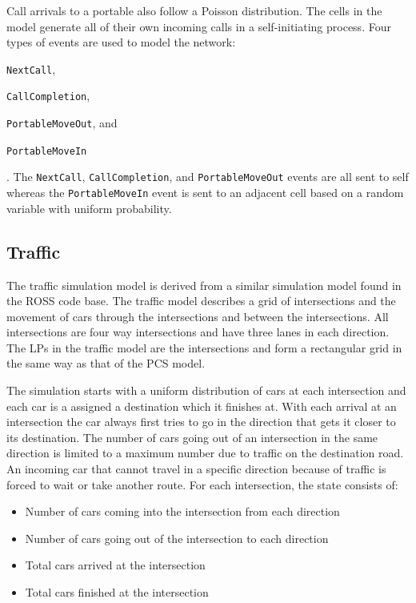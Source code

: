 \documentclass[11pt]{book}
\begin{document}
\noindent
Call arrivals to a portable also follow a Poisson distribution.  The cells in the model generate all
of their own incoming calls in a self-initiating process.  Four types of events are used to model
the network: \begin{inparaenum}[(1)] \item \texttt{NextCall},
\item \texttt{CallCompletion}, \item \texttt{PortableMoveOut}, and \item \texttt{PortableMoveIn}
\end{inparaenum}.  The \texttt{NextCall}, \texttt{CallCompletion}, and \texttt{PortableMoveOut}
events are all sent to self whereas the \texttt{PortableMoveIn} event is sent to an adjacent
cell based on a random variable with uniform probability.

\subsection{Traffic}

The traffic simulation model is derived from a similar simulation model found in the ROSS
\cite{carothers-00} code base.  The traffic model describes a grid of intersections and the movement
of cars through the intersections and between the intersections.  All intersections are four way
intersections and have three lanes in each direction.  The LPs in the traffic model are the
intersections and form a rectangular grid in the same way as that of the PCS model.

The simulation starts with a uniform distribution of cars at each intersection and each car is a
assigned a destination which it finishes at.  With each arrival at an intersection the car always
first tries to go in the direction that gets it closer to its destination.  The number of cars going
out of an intersection in the same direction is limited to a maximum number due to traffic on the
destination road.  An incoming car that cannot travel in a specific direction because of traffic is
forced to wait or take another route.  For each intersection, the state consists of:

\begin{itemize}
    \item Number of cars coming into the intersection from each direction
    \item Number of cars going out of the intersection to each direction
    \item Total cars arrived at the intersection
    \item Total cars finished at the intersection
\end{itemize}
\end{document}

